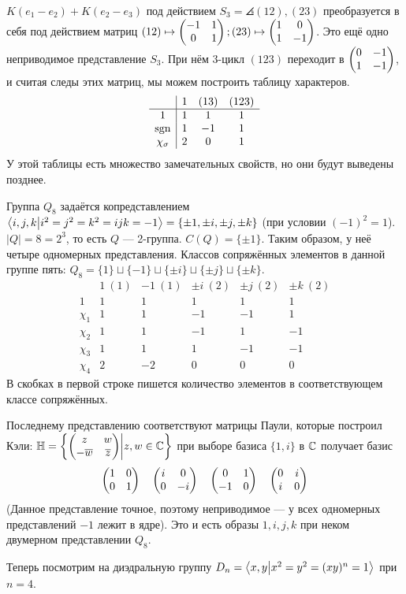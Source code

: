 {    $K(e_1 - e_2) + K(e_2 - e_3)$ под действием $S_3 = \angles{(12), (23)}$ преобразуется в себя под действием матриц $(12) \mapsto \begin{pmatrix}-1 & 1 \\ 0 & 1\end{pmatrix}; (23) \mapsto \begin{pmatrix}1 & 0 \\ 1 & -1\end{pmatrix}$.
    Это ещё одно неприводимое представление $S_3$.
    При нём 3-цикл $(123)$ переходит в $\begin{pmatrix}0 & -1 \\ 1 & -1\end{pmatrix}$, и считая следы этих матриц, мы можем построить таблицу характеров.
    \[\begin{array}{c|ccc}
          & 1 & (13) & (123) \\\hline 1 & 1 & 1 & 1 \\ \operatorname{sgn} & 1 & -1 & 1 \\ \chi_{\sigma} & 2 & 0 & 1
    \end{array}\]
    У этой таблицы есть множество замечательных свойств, но они будут выведены позднее.
    \item Группа $Q_8$ задаётся копредставлением $\left\langle i,j,k\middle| i^2 = j^2 = k^2 = ijk = -1\right\rangle = \{\pm 1, \pm i, \pm j, \pm k\}$ (при условии $(-1)^2 = 1$).
    $|Q| = 8 = 2^3$, то есть $Q$ --- 2-группа. $C(Q) = \{\pm 1\}$.
    Таким образом, у неё четыре одномерных представления.
    Классов сопряжённых элементов в данной группе пять: $Q_8 = \{1\} \sqcup \{-1\} \sqcup \{\pm i\} \sqcup \{\pm j\} \sqcup \{\pm k\}$.
    \[\begin{array}{c|ccccc}
          & 1 ~(1) & -1 ~(1) & \pm i ~(2) & \pm j ~(2) & \pm k ~(2) \\\hline 1 & 1      & 1       & 1         & 1         & 1          \\
          \chi_1 & 1      & 1       & -1         & -1          & 1         \\
          \chi_2 & 1      & 1       & -1          & 1         & -1         \\
          \chi_3 & 1      & 1      & 1          & -1          & -1          \\
          \chi_4 & 2      & -2      & 0          & 0          & 0
    \end{array}\]
    В скобках в первой строке пишется количество элементов в соответствующем классе сопряжённых.

    Последнему представлению соответствуют матрицы Паули, которые построил Кэли: $\mathbb{H} = \left\{\begin{pmatrix}z & w \\ -\overline{w} & \overline{z}\end{pmatrix}\middle|z, w \in \mathbb{C}\right\}$ при выборе базиса $\{1, i\}$ в $\mathbb{C}$ получает базис
    \[\begin{pmatrix}1 & 0 \\ 0 & 1\end{pmatrix} \quad \begin{pmatrix}i & 0 \\ 0 & -i\end{pmatrix} \quad \begin{pmatrix}0 & 1 \\ -1 & 0\end{pmatrix} \quad \begin{pmatrix}0 & i \\ i & 0\end{pmatrix}\]
    (Данное представление точное, поэтому неприводимое --- у всех одномерных представлений $-1$ лежит в ядре).
    Это и есть образы $1, i, j, k$ при неком двумерном представлении $Q_8$.
    \item Теперь посмотрим на диэдральную группу $D_n= \left\langle x, y\middle|x^2 = y^2 = (xy)^n = 1\right\rangle$ при $n = 4$.

}
